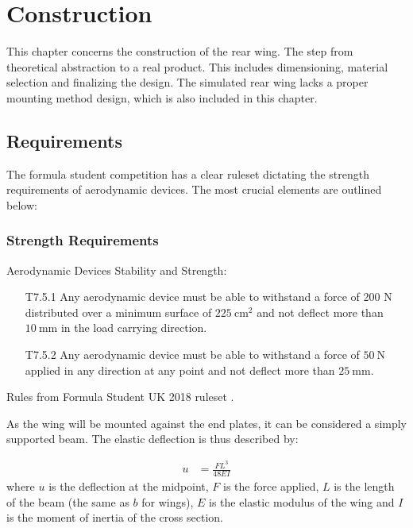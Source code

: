 \chapter{Construction}

  This chapter concerns the construction of the rear wing. The step from theoretical abstraction to a real product. This includes dimensioning, material selection and finalizing the design. The simulated rear wing lacks a proper mounting method design, which is also included in this chapter.

\section{Requirements}

  The formula student competition has a clear ruleset dictating the strength requirements of aerodynamic devices. The most crucial elements are outlined below:

  \subsection{Strength Requirements}
    \begin{tcolorbox}[colframe=seapurple,colback=seapurple!1]
      Aerodynamic Devices Stability and Strength:
      \begin{itemize}
        \item [T7.5.1] Any aerodynamic device must be able to withstand a force of 200 N distributed over a minimum surface of $\SI{225}{\centi\metre\squared}$ and not deflect more than $\SI{10}{\milli\metre}$ in the load carrying direction.
        \item [T7.5.2] Any aerodynamic device must be able to withstand a force of $\SI{50}{\newton}$ applied in any direction at any point and not deflect more than $\SI{25}{\milli\metre}$.
      \end{itemize}

      \hspace*{\fill}\tiny{Rules from Formula Student UK 2018 ruleset \cite{FSrules18}.}
    \end{tcolorbox}

    As the wing will be mounted against the end plates, it can be considered a simply supported beam. The elastic deflection is thus described by:

    \begin{align}
      u &= \frac{FL^3}{48EI}
    \end{align}
    where $u$ is the deflection at the midpoint, $F$ is the force applied, $L$ is the length of the beam (the same as $b$ for wings), $E$ is the elastic modulus of the wing and $I$ is the moment of inertia of the cross section.

